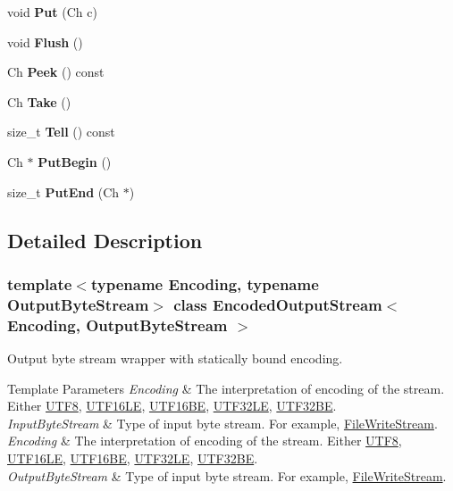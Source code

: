 \begin{DoxyCompactItemize}
void {\bfseries Put} (Ch c)
\item 
\mbox{\label{classEncodedOutputStream_a657188f6a9f0fae01a4012c288d3fd46}} 
void {\bfseries Flush} ()
\item 
\mbox{\label{classEncodedOutputStream_a22e00087e16ad7a12438fb34fb562bb7}} 
Ch {\bfseries Peek} () const
\item 
\mbox{\label{classEncodedOutputStream_a90f5a5e1598316a417ef5b6ad3d49f36}} 
Ch {\bfseries Take} ()
\item 
\mbox{\label{classEncodedOutputStream_a1c6f6d51999b8d04e4d81d92ff725dbc}} 
size\+\_\+t {\bfseries Tell} () const
\item 
\mbox{\label{classEncodedOutputStream_a78934de4f76c9fa65238e65d3630cbc5}} 
Ch $\ast$ {\bfseries Put\+Begin} ()
\item 
\mbox{\label{classEncodedOutputStream_a818695f6d3fa8896e9d7d0fbdc7d4514}} 
size\+\_\+t {\bfseries Put\+End} (Ch $\ast$)
\end{DoxyCompactItemize}


\subsection{Detailed Description}
\subsubsection*{template$<$typename Encoding, typename Output\+Byte\+Stream$>$\newline
class Encoded\+Output\+Stream$<$ Encoding, Output\+Byte\+Stream $>$}

Output byte stream wrapper with statically bound encoding. 


\begin{DoxyTemplParams}{Template Parameters}
{\em Encoding} & The interpretation of encoding of the stream. Either \hyperlink{structUTF8}{U\+T\+F8}, \hyperlink{structUTF16LE}{U\+T\+F16\+LE}, \hyperlink{structUTF16BE}{U\+T\+F16\+BE}, \hyperlink{structUTF32LE}{U\+T\+F32\+LE}, \hyperlink{structUTF32BE}{U\+T\+F32\+BE}. \\
\hline
{\em Input\+Byte\+Stream} & Type of input byte stream. For example, \hyperlink{classFileWriteStream}{File\+Write\+Stream}.\\
\hline
{\em Encoding} & The interpretation of encoding of the stream. Either \hyperlink{structUTF8}{U\+T\+F8}, \hyperlink{structUTF16LE}{U\+T\+F16\+LE}, \hyperlink{structUTF16BE}{U\+T\+F16\+BE}, \hyperlink{structUTF32LE}{U\+T\+F32\+LE}, \hyperlink{structUTF32BE}{U\+T\+F32\+BE}. \\
\hline
{\em Output\+Byte\+Stream} & Type of input byte stream. For example, \hyperlink{classFileWriteStream}{File\+Write\+Stream}. \\
\hline
\end{DoxyTemplParams}


